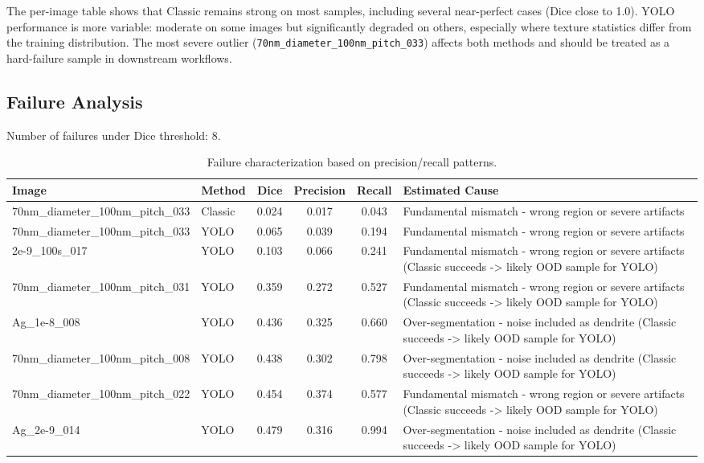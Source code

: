 \documentclass[11pt,a4paper]{article}
\begin{document}
The per-image table shows that Classic remains strong on most samples, including several near-perfect cases (Dice close to 1.0).
YOLO performance is more variable: moderate on some images but significantly degraded on others, especially where texture statistics differ from the training distribution.
The most severe outlier (\texttt{70nm\_diameter\_100nm\_pitch\_033}) affects both methods and should be treated as a hard-failure sample in downstream workflows.

\subsection*{Failure Analysis}
Number of failures under Dice threshold: 8.
\begin{table}[H]
\centering
\scriptsize
\begin{tabularx}{\linewidth}{llcccX}
\toprule
Image & Method & Dice & Precision & Recall & Estimated Cause \\
\midrule
70nm\_diameter\_100nm\_pitch\_033 & Classic & 0.024 & 0.017 & 0.043 & Fundamental mismatch - wrong region or severe artifacts \\

70nm\_diameter\_100nm\_pitch\_033 & YOLO & 0.065 & 0.039 & 0.194 & Fundamental mismatch - wrong region or severe artifacts \\

2e-9\_100s\_017 & YOLO & 0.103 & 0.066 & 0.241 & Fundamental mismatch - wrong region or severe artifacts (Classic succeeds -> likely OOD sample for YOLO) \\

70nm\_diameter\_100nm\_pitch\_031 & YOLO & 0.359 & 0.272 & 0.527 & Fundamental mismatch - wrong region or severe artifacts (Classic succeeds -> likely OOD sample for YOLO) \\

Ag\_1e-8\_008 & YOLO & 0.436 & 0.325 & 0.660 & Over-segmentation - noise included as dendrite (Classic succeeds -> likely OOD sample for YOLO) \\

70nm\_diameter\_100nm\_pitch\_008 & YOLO & 0.438 & 0.302 & 0.798 & Over-segmentation - noise included as dendrite (Classic succeeds -> likely OOD sample for YOLO) \\

70nm\_diameter\_100nm\_pitch\_022 & YOLO & 0.454 & 0.374 & 0.577 & Fundamental mismatch - wrong region or severe artifacts (Classic succeeds -> likely OOD sample for YOLO) \\

Ag\_2e-9\_014 & YOLO & 0.479 & 0.316 & 0.994 & Over-segmentation - noise included as dendrite (Classic succeeds -> likely OOD sample for YOLO) \\
\bottomrule
\end{tabularx}
\caption{Failure characterization based on precision/recall patterns.}
\end{table}
\end{document}
